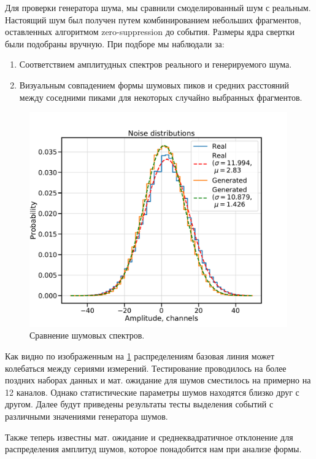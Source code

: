 \documentclass[a4paper,14pt]{extreport}
\begin{document}
Для проверки генератора шума, мы сравнили смоделированный шум с реальным. Настоящий шум был получен путем комбинированием небольших фрагментов, оставленных алгоритмом zero-suppression до события. Размеры ядра свертки были подобраны вручную. При подборе мы наблюдали за:

\begin{enumerate}
    \item Соответствием амплитудных спектров реального и генерируемого шума.
    \item Визуальным совпадением формы шумовых пиков и средних расстояний между соседними пиками для некоторых случайно выбранных фрагментов.
\end{enumerate}

\begin{figure}
  \centering
  \includegraphics[width = 0.99\textwidth]{img/signals/noise_dist_2017_05.pdf}
    \caption{Сравнение шумовых спектров.}
    \label{fig:signals-noise-dist}
\end{figure}

Как видно по изображенным на \ref{fig:signals-noise-dist} распределениям базовая линия может колебаться между сериями измерений. Тестирование проводилось на более поздних наборах данных и мат. ожидание для шумов сместилось на примерно на 12 каналов. Однако статистические параметры шумов находятся близко друг с другом. Далее будут приведены результаты тесты выделения событий с различными значениями генератора шумов.

Также теперь известны мат. ожидание и среднеквадратичное отклонение для распределения амплитуд шумов, которое понадобится нам при анализе формы.
\end{document}
